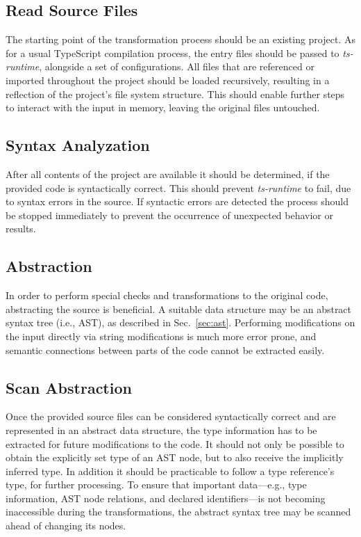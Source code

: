 \subsection{Read Source Files}

The starting point of the transformation process should be an existing project. As for a usual TypeScript compilation process, the entry files should be passed to \emph{ts-runtime}, alongside a set of configurations. All files that are referenced or imported throughout the project should be loaded recursively, resulting in a reflection of the project's file system structure. This should enable further steps to interact with the input in memory, leaving the original files untouched.

\subsection{Syntax Analyzation}

After all contents of the project are available it should be determined, if the provided code is syntactically correct. This should prevent \emph{ts-runtime} to fail, due to syntax errors in the source. If syntactic errors are detected the process should be stopped immediately to prevent the occurrence of unexpected behavior or results.

\subsection{Abstraction}

In order to perform special checks and transformations to the original code, abstracting the source is beneficial. A suitable data structure may be an abstract syntax tree (i.e., AST), as described in Sec.~\ref{sec:ast}. Performing modifications on the input directly via string modifications is much more error prone, and semantic connections between parts of the code cannot be extracted easily.

\subsection{Scan Abstraction}

Once the provided source files can be considered syntactically correct and are represented in an abstract data structure, the type information has to be extracted for future modifications to the code. It should not only be possible to obtain the explicitly set type of an AST node, but to also receive the implicitly inferred type. In addition it should be practicable to follow a type reference's type, for further processing. To ensure that important data---e.g., type information, AST node relations, and declared identifiers---is not becoming inaccessible during the transformations, the abstract syntax tree may be scanned ahead of changing its nodes.

